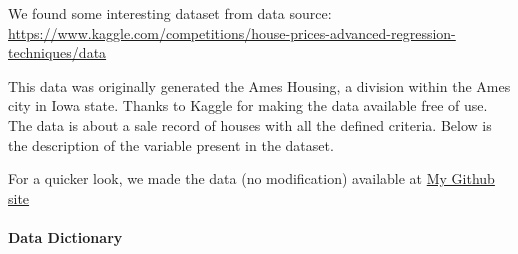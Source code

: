 \documentclass[
]{article}
\begin{document}
We found some interesting dataset from data source:
\url{https://www.kaggle.com/competitions/house-prices-advanced-regression-techniques/data}

This data was originally generated the Ames Housing, a division within
the Ames city in Iowa state. Thanks to Kaggle for making the data
available free of use. The data is about a sale record of houses with
all the defined criteria. Below is the description of the variable
present in the dataset.

For a quicker look, we made the data (no modification) available at
\href{https://github.com/asmozo24/Machine_Learning_Final_Project/blob/main/train.csv}{My
Github site}

\hypertarget{data-dictionary}{%
\paragraph{Data Dictionary}\label{data-dictionary}}
\end{document}
